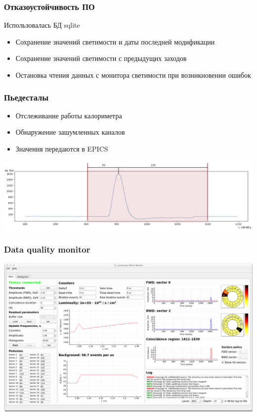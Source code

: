 \documentclass{beamer}
\begin{document}
\begin{frame}
\frametitle{Отказоустойчивость ПО}
  Использовалась БД sqlite
  \begin{itemize}
    \item Сохранение значений светимости и даты последней модификации
    \item Сохранение значений светимости с предыдущих заходов
    \item Остановка чтения данных с монитора светимости при возникновении ошибок
  \end{itemize}
\end{frame}

\begin{frame}
\frametitle{Пьедесталы}
  \begin{itemize}
    \item Отслеживание работы калориметра
    \item Обнаружение зашумленных каналов
    \item Значения передаются в EPICS
  \end{itemize}
  \includegraphics[width=\textwidth]{Pedestal.png}
\end{frame}

\begin{frame}
\frametitle{Data quality monitor}
  \includegraphics[width=\textwidth]{GUI3}
\end{frame}
\end{document}
